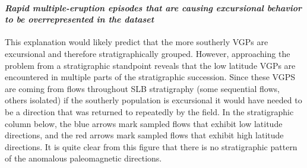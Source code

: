 \documentclass{article}
\begin{document}
\paragraph{\texorpdfstring{\emph{Rapid multiple-eruption episodes that are causing excursional behavior to be overrepresented in the dataset}}{Rapid multiple-eruption episodes that are causing excursional behavior to be overrepresented in the dataset}}\label{rapid-multiple-eruption-episodes-that-are-causing-excursional-behavior-to-be-overrepresented-in-the-dataset}
This explanation would likely predict that the more southerly VGPs are excursional and therefore stratigraphically grouped. However, approaching the problem from a stratigraphic standpoint reveals that the low latitude VGPs are encountered in multiple parts of the stratigraphic succession. Since these VGPS are coming from flows throughout SLB stratigraphy (some sequential flows, others isolated) if the southerly population is excursional it would have needed to be a direction that was returned to repeatedly by the field. In the stratigraphic column below, the blue arrows mark sampled flows that exhibit low latitude directions, and the red arrows mark sampled flows that exhibit high latitude directions. It is quite clear from this figure that there is no stratigraphic pattern of the anomalous paleomagnetic directions.\\
\end{document}
